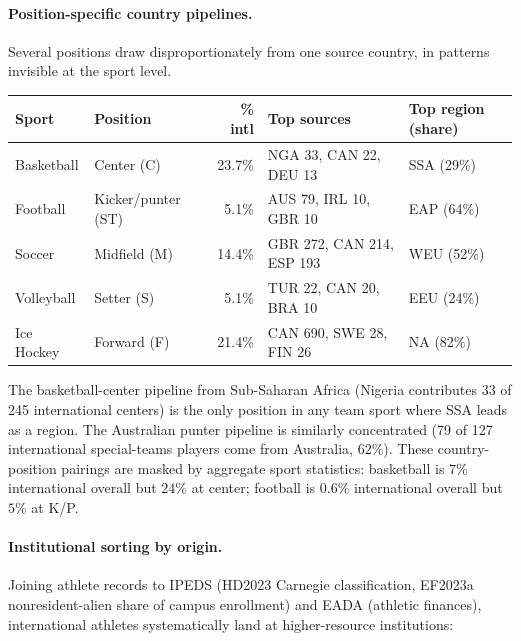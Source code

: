 \documentclass[11pt]{article}
\begin{document}
\paragraph{Position-specific country pipelines.}  Several positions
draw disproportionately from one source country, in patterns invisible
at the sport level.

\begin{center}
\small
\begin{tabular}{llrll}
\toprule
Sport & Position & \% intl & Top sources & Top region (share) \\
\midrule
Basketball  & Center (C)             & 23.7\% & NGA 33, CAN 22, DEU 13 & SSA (29\%) \\
Football    & Kicker/punter (ST)     & 5.1\%  & AUS 79, IRL 10, GBR 10 & EAP (64\%) \\
Soccer      & Midfield (M)           & 14.4\% & GBR 272, CAN 214, ESP 193 & WEU (52\%) \\
Volleyball  & Setter (S)             & 5.1\%  & TUR 22, CAN 20, BRA 10 & EEU (24\%) \\
Ice Hockey  & Forward (F)            & 21.4\% & CAN 690, SWE 28, FIN 26 & NA (82\%) \\
\bottomrule
\end{tabular}
\end{center}

The basketball-center pipeline from Sub-Saharan Africa (Nigeria
contributes 33 of 245 international centers) is the only position
in any team sport where SSA leads as a region. The Australian
punter pipeline is similarly concentrated (79 of 127 international
special-teams players come from Australia, $62\%$). These
country-position pairings are masked by aggregate sport
statistics: basketball is $7\%$ international overall but
$24\%$ at center; football is $0.6\%$ international overall but
$5\%$ at K/P.

\paragraph{Institutional sorting by origin.}  Joining athlete records
to IPEDS (HD2023 Carnegie classification, EF2023a nonresident-alien
share of campus enrollment) and EADA (athletic finances), international
athletes systematically land at higher-resource institutions:
\end{document}
